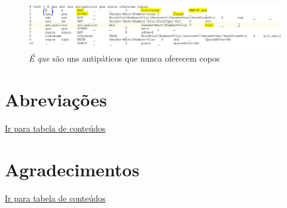\documentclass[output=paper,colorlinks,citecolor=brown]{langscibook}
\begin{document}
	\begin{figure}
    	\centering
    	\includegraphics[width=\textwidth,height=\textheight,keepaspectratio]{imagesDrive/image71.png}
    	\caption{\emph{É que} são uns antipáticos que nunca oferecem copos}
    	\label{fig:equeMWE3}
    	\end{figure}{}

	
\chapter*{Abreviações}

\hyperlink{toc}{Ir para tabela de conteúdos\\}



\chapter*{Agradecimentos}

\hyperlink{toc}{Ir para tabela de conteúdos\\}



\printbibliography[heading=subbibliography,notkeyword=this]
\end{document}
